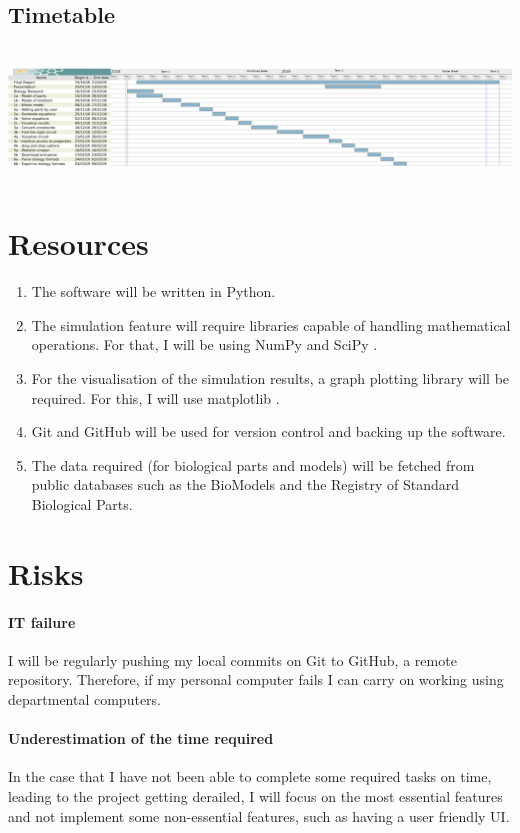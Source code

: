\documentclass{article}
\begin{document}
	\subsection{Timetable}
	\includegraphics[height=100pt]{timetable}
	
	\section{Resources}
	\begin{enumerate}
		\item The software will be written in Python.
		\item The simulation feature will require libraries capable of handling mathematical operations. For that, I will be using NumPy \cite{numpy} and SciPy \cite{scipy}.
		\item For the visualisation of the simulation results, a graph plotting library will be required. For this, I will use matplotlib \cite{matplotlib}.
		\item Git and GitHub will be used for version control and backing up the software.
		\item The data required (for biological parts and models) will be fetched from public databases such as the BioModels \cite{biomodels} and the Registry of Standard Biological Parts. \cite{rsbp}
	\end{enumerate}

	\section{Risks}
	\paragraph{IT failure} I will be regularly pushing my local commits on Git to GitHub, a remote repository. Therefore, if my personal computer fails I can carry on working using departmental computers.
	\paragraph{Underestimation of the time required} In the case that I have not been able to complete some required tasks on time, leading to the project getting derailed, I will focus on the most essential features and not implement some non-essential features, such as having a user friendly UI.
\end{document}
